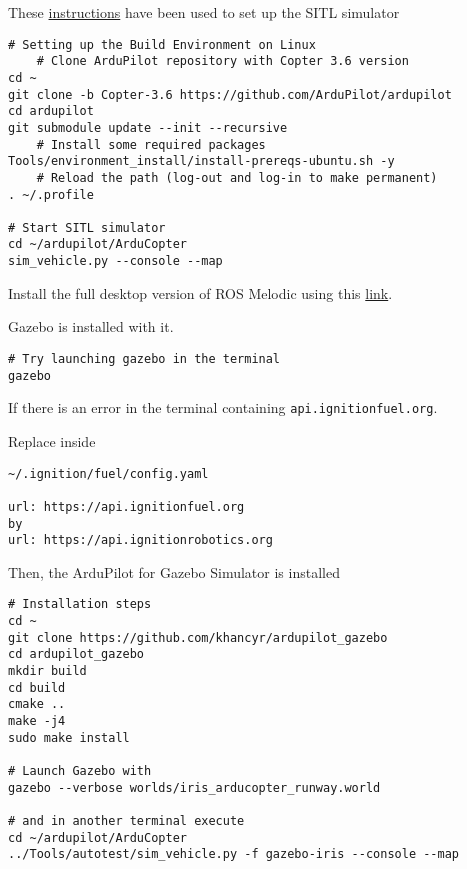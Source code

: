 These \href{http://ardupilot.org/dev/docs/setting-up-sitl-on-linux.html}{instructions} have been used to set up the SITL simulator

\begin{verbatim}
# Setting up the Build Environment on Linux
    # Clone ArduPilot repository with Copter 3.6 version
cd ~
git clone -b Copter-3.6 https://github.com/ArduPilot/ardupilot
cd ardupilot
git submodule update --init --recursive
    # Install some required packages
Tools/environment_install/install-prereqs-ubuntu.sh -y
    # Reload the path (log-out and log-in to make permanent)
. ~/.profile

# Start SITL simulator
cd ~/ardupilot/ArduCopter
sim_vehicle.py --console --map
            \end{verbatim}

Install the full desktop version of ROS Melodic using this \href{http://wiki.ros.org/melodic/Installation/Ubuntu}{link}.

Gazebo is installed with it.

\begin{verbatim}
# Try launching gazebo in the terminal
gazebo
            \end{verbatim}

If there is an error in the terminal containing \texttt{api.ignitionfuel.org}.

Replace inside
\begin{verbatim}
~/.ignition/fuel/config.yaml

url: https://api.ignitionfuel.org
by
url: https://api.ignitionrobotics.org
            \end{verbatim}

Then, the ArduPilot for Gazebo Simulator is installed
\begin{verbatim}
# Installation steps
cd ~
git clone https://github.com/khancyr/ardupilot_gazebo
cd ardupilot_gazebo
mkdir build
cd build
cmake ..
make -j4
sudo make install

# Launch Gazebo with
gazebo --verbose worlds/iris_arducopter_runway.world

# and in another terminal execute
cd ~/ardupilot/ArduCopter
../Tools/autotest/sim_vehicle.py -f gazebo-iris --console --map
            \end{verbatim}

